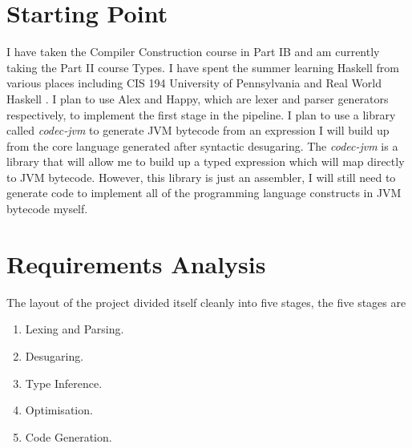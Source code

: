 \documentclass[float=false, crop=false]{standalone}
\begin{document}
\section{Starting Point}


  I have taken the Compiler Construction course in Part IB and am currently taking the Part II course Types. I have spent the summer
  learning Haskell from various places including CIS 194 University of Pennsylvania \cite{cis194} and Real World Haskell \cite{realworldhaskell}.
  I plan to use Alex and Happy, which are lexer and parser generators
  respectively, to implement the first stage in the pipeline.
  I plan to use a library called \textit{codec-jvm} to generate JVM bytecode from an expression I will build up from the core language generated after
  syntactic desugaring. The \textit{codec-jvm} is a library that will allow me to build up a typed expression which will map directly
  to JVM bytecode. However, this library is just an assembler, I will still need to generate code to implement all of the
  programming language constructs in JVM bytecode myself.

\section{Requirements Analysis}

The layout of the project divided itself cleanly into five stages, the five stages are
\begin{enumerate}
  \item Lexing and Parsing.
  \item Desugaring.
  \item Type Inference.
  \item Optimisation.
  \item Code Generation.
\end{enumerate}
\end{document}
